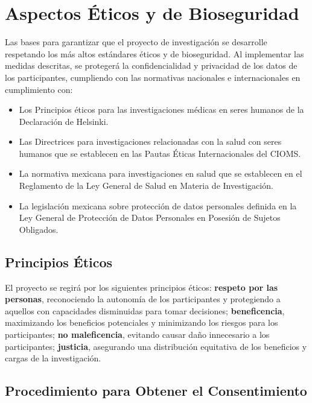 \section{Aspectos Éticos y de Bioseguridad}
\label{sec:aspectos_eticos_bioseguridad}

Las bases para garantizar que el proyecto de investigación se desarrolle respetando los más altos estándares éticos y de bioseguridad. Al implementar las medidas descritas, se protegerá la confidencialidad y privacidad de los datos de los participantes, cumpliendo con las normativas nacionales e internacionales en cumplimiento con:

\begin{itemize}
    \item Los Principios éticos para las investigaciones médicas en seres humanos de la Declaración de Helsinki.
    
    \item Las Directrices para investigaciones relacionadas con la salud con seres humanos que se establecen en las Pautas Éticas Internacionales del CIOMS.
    
    \item La normativa mexicana para investigaciones en salud que se establecen en el Reglamento de la Ley General de Salud en Materia de Investigación.
    
    \item La legislación mexicana sobre protección de datos personales definida en la Ley General de Protección de Datos Personales en Posesión de Sujetos Obligados.
\end{itemize}

\subsection{Principios Éticos}
\label{subsec:principios_eticos}

El proyecto se regirá por los siguientes principios éticos: \textbf{respeto por las personas}, reconociendo la autonomía de los participantes y protegiendo a aquellos con capacidades disminuidas para tomar decisiones; \textbf{beneficencia}, maximizando los beneficios potenciales y minimizando los riesgos para los participantes; \textbf{no maleficencia}, evitando causar daño innecesario a los participantes; \textbf{justicia}, asegurando una distribución equitativa de los beneficios y cargas de la investigación.

\subsection{Procedimiento para Obtener el Consentimiento}
\label{subsec:procedimiento_consentimiento}

